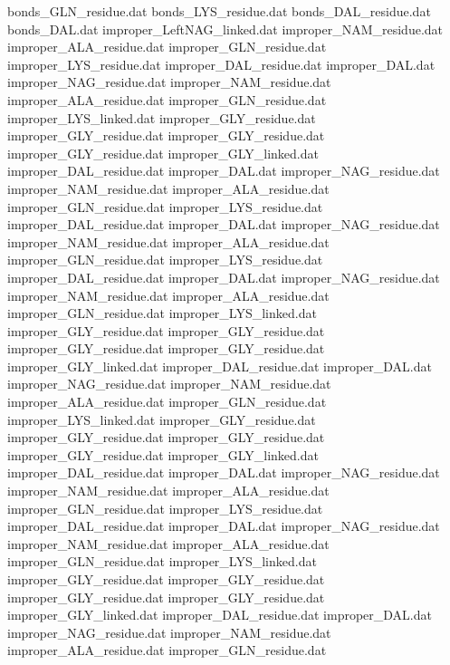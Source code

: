 bonds_GLN_residue.dat           
bonds_LYS_residue.dat           
bonds_DAL_residue.dat           
bonds_DAL.dat                   
improper_LeftNAG_linked.dat     
improper_NAM_residue.dat        
improper_ALA_residue.dat        
improper_GLN_residue.dat        
improper_LYS_residue.dat        
improper_DAL_residue.dat        
improper_DAL.dat                
improper_NAG_residue.dat        
improper_NAM_residue.dat        
improper_ALA_residue.dat        
improper_GLN_residue.dat        
improper_LYS_linked.dat         
improper_GLY_residue.dat
improper_GLY_residue.dat
improper_GLY_residue.dat
improper_GLY_residue.dat
improper_GLY_linked.dat
improper_DAL_residue.dat        
improper_DAL.dat                
improper_NAG_residue.dat        
improper_NAM_residue.dat        
improper_ALA_residue.dat        
improper_GLN_residue.dat        
improper_LYS_residue.dat        
improper_DAL_residue.dat        
improper_DAL.dat                
improper_NAG_residue.dat        
improper_NAM_residue.dat        
improper_ALA_residue.dat        
improper_GLN_residue.dat        
improper_LYS_residue.dat        
improper_DAL_residue.dat        
improper_DAL.dat                
improper_NAG_residue.dat        
improper_NAM_residue.dat        
improper_ALA_residue.dat        
improper_GLN_residue.dat        
improper_LYS_linked.dat         
improper_GLY_residue.dat
improper_GLY_residue.dat
improper_GLY_residue.dat
improper_GLY_residue.dat
improper_GLY_linked.dat
improper_DAL_residue.dat        
improper_DAL.dat                
improper_NAG_residue.dat        
improper_NAM_residue.dat        
improper_ALA_residue.dat        
improper_GLN_residue.dat        
improper_LYS_linked.dat         
improper_GLY_residue.dat
improper_GLY_residue.dat
improper_GLY_residue.dat
improper_GLY_residue.dat
improper_GLY_linked.dat
improper_DAL_residue.dat        
improper_DAL.dat                
improper_NAG_residue.dat        
improper_NAM_residue.dat        
improper_ALA_residue.dat        
improper_GLN_residue.dat        
improper_LYS_residue.dat        
improper_DAL_residue.dat        
improper_DAL.dat                
improper_NAG_residue.dat        
improper_NAM_residue.dat        
improper_ALA_residue.dat        
improper_GLN_residue.dat        
improper_LYS_linked.dat         
improper_GLY_residue.dat
improper_GLY_residue.dat
improper_GLY_residue.dat
improper_GLY_residue.dat
improper_GLY_linked.dat
improper_DAL_residue.dat        
improper_DAL.dat                
improper_NAG_residue.dat        
improper_NAM_residue.dat        
improper_ALA_residue.dat        
improper_GLN_residue.dat        
